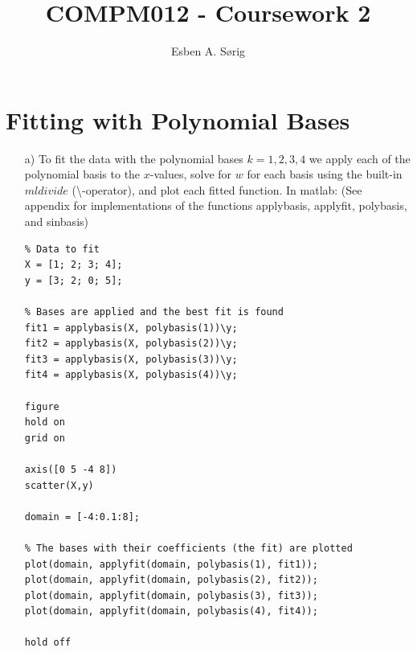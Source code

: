 \documentclass[11pt]{article}
\begin{document}
\lstset{language=Matlab}

\title{COMPM012 - Coursework 2}
\author{Esben A. S\o rig}

\maketitle

\section{Fitting with Polynomial Bases}
\begin{itemize}
    \item[a)]
        To fit the data with the polynomial bases $k=1,2,3,4$ we apply each of the polynomial basis to the $x$-values, solve for $w$ for each basis using the built-in $mldivide$ (\textbackslash -operator), and plot each fitted function. In matlab: (See appendix for implementations of the functions applybasis, applyfit, polybasis, and sinbasis)
        \begin{lstlisting}
% Data to fit
X = [1; 2; 3; 4];
y = [3; 2; 0; 5];

% Bases are applied and the best fit is found
fit1 = applybasis(X, polybasis(1))\y;
fit2 = applybasis(X, polybasis(2))\y;
fit3 = applybasis(X, polybasis(3))\y;
fit4 = applybasis(X, polybasis(4))\y;

figure 
hold on
grid on

axis([0 5 -4 8])
scatter(X,y)

domain = [-4:0.1:8];

% The bases with their coefficients (the fit) are plotted
plot(domain, applyfit(domain, polybasis(1), fit1));
plot(domain, applyfit(domain, polybasis(2), fit2));
plot(domain, applyfit(domain, polybasis(3), fit3));
plot(domain, applyfit(domain, polybasis(4), fit4));

hold off\end{lstlisting}
        

\end{itemize}
\end{document}
